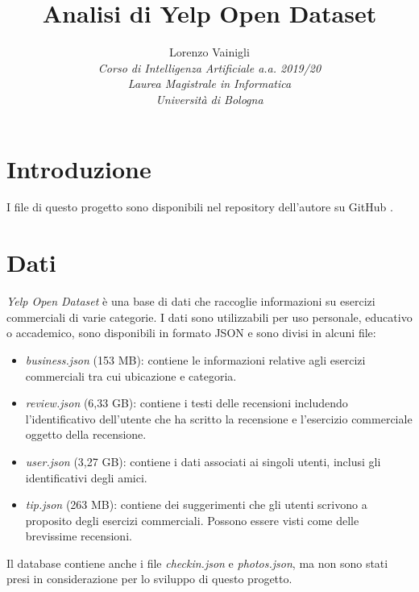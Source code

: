 \documentclass[12pt]{article}
\title{Analisi di Yelp Open Dataset}
\author{
        Lorenzo Vainigli\\
        \textit{\small Corso di Intelligenza Artificiale a.a. 2019/20}\\
        \textit{\small Laurea Magistrale in Informatica}\\
        \textit{\small Università di Bologna}
}
\date{}
\begin{document}
\maketitle

\section{Introduzione}
I file di questo progetto sono disponibili nel repository dell'autore su GitHub \cite{repo}. 

\section{Dati}
\textit{Yelp Open Dataset} \cite{yelp} è una base di dati che raccoglie informazioni su esercizi commerciali di varie categorie. I dati sono utilizzabili per uso personale, educativo o accademico, sono disponibili in formato JSON e sono divisi in alcuni file:
\begin{itemize}
\item \textit{business.json} (153 MB): contiene le informazioni relative agli esercizi commerciali tra cui ubicazione e categoria.
\item \textit{review.json} (6,33 GB): contiene i testi delle recensioni includendo l'identificativo dell'utente che ha scritto la recensione e l'esercizio commerciale oggetto della recensione.
\item \textit{user.json} (3,27 GB): contiene i dati associati ai singoli utenti, inclusi gli identificativi degli amici.
\item \textit{tip.json} (263 MB): contiene dei suggerimenti che gli utenti scrivono a proposito degli esercizi commerciali. Possono essere visti come delle brevissime recensioni.
\end{itemize}
Il database contiene anche i file \textit{checkin.json} e \textit{photos.json}, ma non sono stati presi in considerazione per lo sviluppo di questo progetto.
\end{document}
